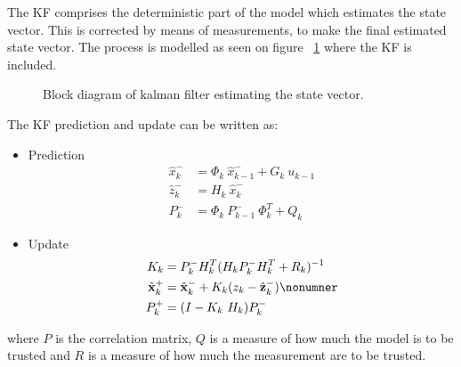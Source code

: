 The \ac{KF} comprises the deterministic part of the model which estimates the state vector. This is corrected by means of measurements, to make the final estimated state vector. The process is modelled as seen on figure ~\ref{fig:blockkf} where the \ac{KF} is included.

\begin{figure}
	\centering
	
	\caption{Block diagram of kalman filter estimating the state vector.}
	\label{fig:blockkf}
\end{figure}

The \ac{KF} prediction and update can be written as:
\begin{itemize}
\item Prediction
\begin{align}
\hat x_{k}^- &= \Phi_{k}\ \hat x_{k-1}^- + G_{k}\ u_{k-1}\nonumber\\
\hat z_{k}^- &= H_{k}\ \hat x_{k}^-\nonumber\\
P_{k}^- &= \Phi_{k}\ P_{k-1}^-\ \Phi_{k}^T + Q_{k}\nonumber
\end{align}

\item Update
\begin{align}
K_{k} &= P_{k}^- H_{k}^T(H_{k} P_{k}^- H_{k}^T+R_{k})^{-1}\nonumber\\
\hat x_{k}^+ &= \hat x_{k}^- + K_{k}(z_{k}-\hat z_{k}^-)\nonumner\\
P_{k}^+ &= (I-K_{k}\ H_{k})P_{k}^-\nonumber
\end{align}
\end{itemize}
where $P$ is the correlation matrix, $Q$ is a measure of how much the model is to be trusted and $R$ is a measure of how much the measurement are to be trusted.